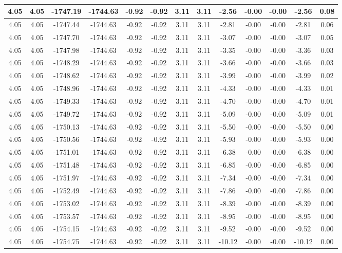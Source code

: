 \begin{table}[htbp]
\begin{adjustbox}{angle=90}
\begin{tabular}{|c|c|c|c|c|c|c|c|c|c|c|c|c|}
 4.05 & 4.05 & -1747.19 & -1744.63 & -0.92 & -0.92 & 3.11 & 3.11 & -2.56 & -0.00 & -0.00 & -2.56 & 0.08\\ \hline
 4.05 & 4.05 & -1747.44 & -1744.63 & -0.92 & -0.92 & 3.11 & 3.11 & -2.81 & -0.00 & -0.00 & -2.81 & 0.06\\ \hline
 4.05 & 4.05 & -1747.70 & -1744.63 & -0.92 & -0.92 & 3.11 & 3.11 & -3.07 & -0.00 & -0.00 & -3.07 & 0.05\\ \hline
 4.05 & 4.05 & -1747.98 & -1744.63 & -0.92 & -0.92 & 3.11 & 3.11 & -3.35 & -0.00 & -0.00 & -3.36 & 0.03\\ \hline
 4.05 & 4.05 & -1748.29 & -1744.63 & -0.92 & -0.92 & 3.11 & 3.11 & -3.66 & -0.00 & -0.00 & -3.66 & 0.03\\ \hline
 4.05 & 4.05 & -1748.62 & -1744.63 & -0.92 & -0.92 & 3.11 & 3.11 & -3.99 & -0.00 & -0.00 & -3.99 & 0.02\\ \hline
 4.05 & 4.05 & -1748.96 & -1744.63 & -0.92 & -0.92 & 3.11 & 3.11 & -4.33 & -0.00 & -0.00 & -4.33 & 0.01\\ \hline
 4.05 & 4.05 & -1749.33 & -1744.63 & -0.92 & -0.92 & 3.11 & 3.11 & -4.70 & -0.00 & -0.00 & -4.70 & 0.01\\ \hline
 4.05 & 4.05 & -1749.72 & -1744.63 & -0.92 & -0.92 & 3.11 & 3.11 & -5.09 & -0.00 & -0.00 & -5.09 & 0.01\\ \hline
 4.05 & 4.05 & -1750.13 & -1744.63 & -0.92 & -0.92 & 3.11 & 3.11 & -5.50 & -0.00 & -0.00 & -5.50 & 0.00\\ \hline
 4.05 & 4.05 & -1750.56 & -1744.63 & -0.92 & -0.92 & 3.11 & 3.11 & -5.93 & -0.00 & -0.00 & -5.93 & 0.00\\ \hline
 4.05 & 4.05 & -1751.01 & -1744.63 & -0.92 & -0.92 & 3.11 & 3.11 & -6.38 & -0.00 & -0.00 & -6.38 & 0.00\\ \hline
 4.05 & 4.05 & -1751.48 & -1744.63 & -0.92 & -0.92 & 3.11 & 3.11 & -6.85 & -0.00 & -0.00 & -6.85 & 0.00\\ \hline
 4.05 & 4.05 & -1751.97 & -1744.63 & -0.92 & -0.92 & 3.11 & 3.11 & -7.34 & -0.00 & -0.00 & -7.34 & 0.00\\ \hline
 4.05 & 4.05 & -1752.49 & -1744.63 & -0.92 & -0.92 & 3.11 & 3.11 & -7.86 & -0.00 & -0.00 & -7.86 & 0.00\\ \hline
 4.05 & 4.05 & -1753.02 & -1744.63 & -0.92 & -0.92 & 3.11 & 3.11 & -8.39 & -0.00 & -0.00 & -8.39 & 0.00\\ \hline
 4.05 & 4.05 & -1753.57 & -1744.63 & -0.92 & -0.92 & 3.11 & 3.11 & -8.95 & -0.00 & -0.00 & -8.95 & 0.00\\ \hline
 4.05 & 4.05 & -1754.15 & -1744.63 & -0.92 & -0.92 & 3.11 & 3.11 & -9.52 & -0.00 & -0.00 & -9.52 & 0.00\\ \hline
 4.05 & 4.05 & -1754.75 & -1744.63 & -0.92 & -0.92 & 3.11 & 3.11 & -10.12 & -0.00 & -0.00 & -10.12 & 0.00\\ \hline
            \end{tabular}
        \end{adjustbox}
        \caption{}
        \label{}
    \end{table}
    